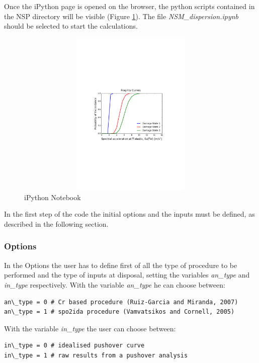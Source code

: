 Once the iPython page is opened on the browser, the python scripts contained in the NSP directory will be visible (Figure \ref{fig:notebook}). The file \textit{NSM\_dispersion.ipynb} should be selected to start the calculations.

\begin{figure}[H]
\centering
\includegraphics[width=12cm,height=8cm]{./figures/IdealisedCurve.pdf}
\caption{iPython Notebook}
\label{fig:notebook}
\end{figure}

In the first step of the code the initial options and the inputs must be defined, as described in the following section. 

\subsubsection{Options}
\label{par:options}
In the Options the user has to define first of all the type of procedure to be performed and the type of inputs at disposal, setting the variables \textit{an\_type} and \textit{in\_type} respectively. With the variable \textit{an\_type} he can choose between:

\begin{Verbatim}[frame=single, commandchars=\\\{\}, samepage=true]
an\_type = 0 # Cr based procedure (Ruiz-Garcia and Miranda, 2007)
an\_type = 1 # spo2ida procedure (Vamvatsikos and Cornell, 2005)
\end{Verbatim}

With the variable \textit{in\_type} the user can choose between:

\begin{Verbatim}[frame=single, commandchars=\\\{\}, samepage=true]
in\_type = 0 # idealised pushover curve
in\_type = 1 # raw results from a pushover analysis
\end{Verbatim}

